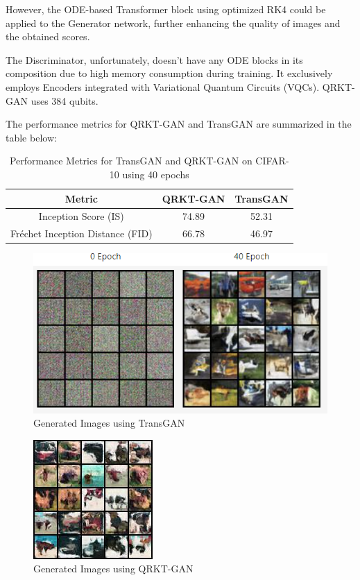 \documentclass[12pt,a4paper]{report}
\begin{document}
However, the ODE-based Transformer block using optimized RK4 could be applied to the Generator network, further enhancing the quality of images and the obtained scores.

The Discriminator, unfortunately, doesn't have any ODE blocks in its composition due to high memory consumption during training. It exclusively employs Encoders integrated with Variational Quantum Circuits (VQCs). QRKT-GAN uses 384 qubits.

The performance metrics for QRKT-GAN and TransGAN are summarized in the table below:

\begin{table}[h!]
  \centering
  \begin{tabular}{|c|c|c|}
    \hline
    \textbf{Metric}                  & \textbf{QRKT-GAN} & \textbf{TransGAN} \\
    \hline
    Inception Score (IS)             & 74.89             & 52.31             \\
    \hline
    Fréchet Inception Distance (FID) & 66.78             & 46.97             \\
    \hline
  \end{tabular}
  \caption{Performance Metrics for TransGAN and QRKT-GAN on CIFAR-10 using 40 epochs}
  \label{table:performance_metrics}
\end{table}

\begin{figure}[th]
  \centering
  \includegraphics[scale=0.7]{./pics/gan_gen.png}
  \caption[Generated Images using TransGAN]{Generated Images using TransGAN~\cite{ahmet_sarigun_2024_10806360}}
  \label{fig:p40}
\end{figure}

\begin{figure}[th]
  \centering
  \includegraphics[scale=0.88]{./pics/generated_img_39_1600.jpg}
  \caption[Generated Images using QRKT-GAN]{Generated Images using QRKT-GAN}
  \label{fig:p41}
\end{figure}
\end{document}
